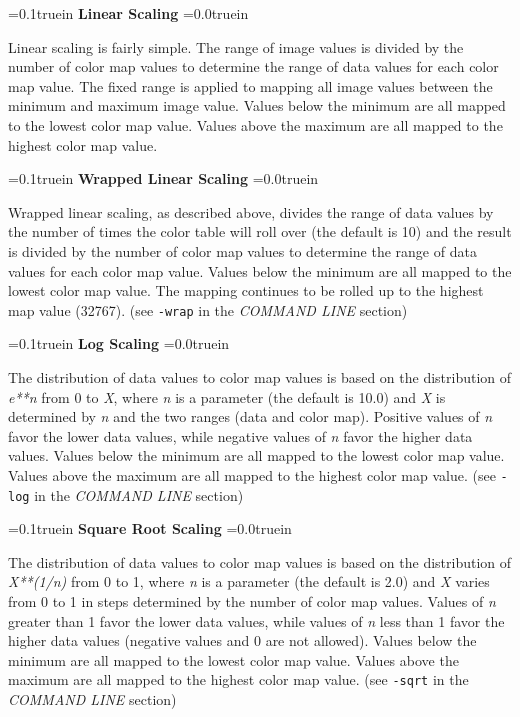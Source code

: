 \parindent=0.1truein
{\bf Linear Scaling}
\parindent=0.0truein
\par
\vspace{0.1in}
Linear scaling is fairly simple.  The range of image values is divided by
the number of color map values to determine the range of data values for
each color map value.  The fixed range is applied to mapping all image
values between the minimum and maximum image value.  Values below the
minimum are all mapped to the lowest color map value.  Values above
the maximum are all mapped to the highest color map value.
\par
\vspace{0.1in}

\parindent=0.1truein
{\bf Wrapped Linear Scaling}
\parindent=0.0truein
\par
\vspace{0.1in}
Wrapped linear scaling, as described above, divides the range of data
values by the number of times the color table will roll over (the
default is 10) and the result is divided by the number of color map
values to determine the range of data values for each color map value.
Values below the minimum are all mapped to the lowest color map value.
The mapping continues to be rolled up to the highest map value
(32767).  (see {\tt -wrap} in the {\em COMMAND LINE} section)
\par
\vspace{0.1in}

\parindent=0.1truein
{\bf Log Scaling}
\parindent=0.0truein
\par
\vspace{0.1in}
The distribution of data values to color map values is based on the
distribution of {\em e**n} from 0 to {\em X}, where {\em n} is a
parameter (the default is 10.0) and {\em X} is determined by {\em n}
and the two ranges (data and color map).  Positive values of {\em n}
favor the lower data values, while negative values of {\em n} favor
the higher data values.  Values below the minimum are all mapped 
to the lowest color map value.  Values above the maximum are all mapped to
the highest color map value.  (see {\tt -log} in the {\em COMMAND LINE}
section)
\par
\vspace{0.1in}

\parindent=0.1truein
{\bf Square Root Scaling}
\parindent=0.0truein
\par
\vspace{0.1in}
The distribution of data values to color map values is based on the
distribution of {\em X**(1/n)} from 0 to 1, where {\em n} is a
parameter (the default is 2.0) and {\em X} varies from 0 to 1 in steps
determined by the number of color map values.  Values of {\em n}
greater than 1 favor the lower data values, while values of {\em n}
less than 1 favor the higher data values (negative values and 0 are
not allowed).  Values below the minimum are all mapped to the lowest
color map value.  Values above the maximum are all mapped to the
highest color map value.  (see {\tt -sqrt} in the {\em COMMAND LINE}
section)
\par
\vspace{0.1in}

